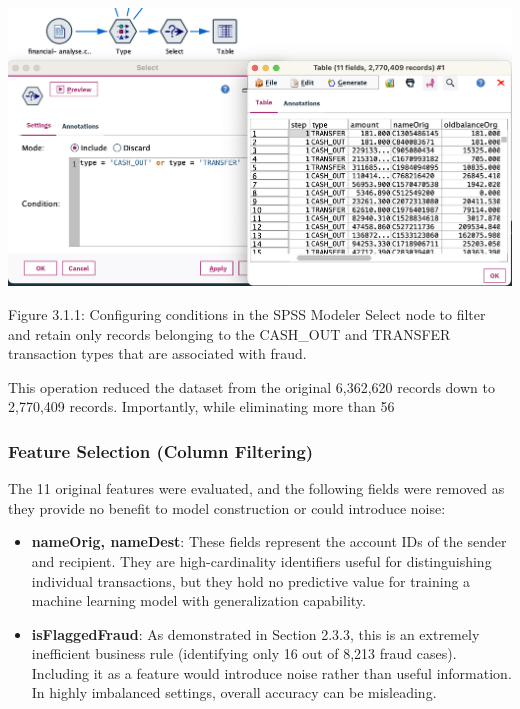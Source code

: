 \documentclass[sigplan,screen]{acmart}
\begin{document}
\begin{center}
\includegraphics[width=0.9\columnwidth]{3.1.1.png}
\vspace{0.2cm}

Figure 3.1.1: Configuring conditions in the SPSS Modeler Select node to filter and retain only records belonging to the CASH\_OUT and TRANSFER transaction types that are associated with fraud.
\end{center}

\vspace{0.3cm}
This operation reduced the dataset from the original 6,362,620 records down to 2,770,409 records. Importantly, while eliminating more than 56%

\subsubsection{Feature Selection (Column Filtering)}

The 11 original features were evaluated, and the following fields were removed as they provide no benefit to model construction or could introduce noise:

\begin{itemize}
\item \textbf{nameOrig, nameDest}: These fields represent the account IDs of the sender and recipient. They are high-cardinality identifiers useful for distinguishing individual transactions, but they hold no predictive value for training a machine learning model with generalization capability.
\item \textbf{isFlaggedFraud}: As demonstrated in Section 2.3.3, this is an extremely inefficient business rule (identifying only 16 out of 8,213 fraud cases). Including it as a feature would introduce noise rather than useful information. In highly imbalanced settings, overall accuracy can be misleading\cite{he2009learning}.
\end{itemize}
    
\end{document}
